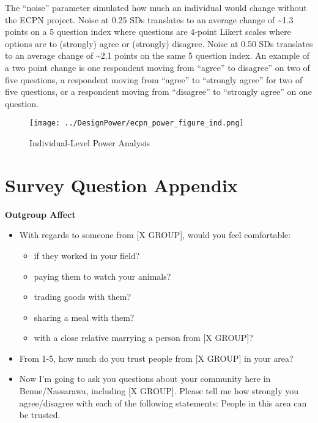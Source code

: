 \documentclass[
]{article}
\providecommand{\tightlist}{%
  \setlength{\itemsep}{0pt}\setlength{\parskip}{0pt}}
\begin{document}
The ``noise'' parameter simulated how much an individual would change
without the ECPN project. Noise at 0.25 SDs translates to an average
change of \textasciitilde1.3 points on a 5 question index where
questions are 4-point Likert scales where options are to (strongly)
agree or (strongly) disagree. Noise at 0.50 SDs translates to an average
change of \textasciitilde2.1 points on the same 5 question index. An
example of a two point change is one respondent moving from ``agree'' to
disagree'' on two of five questions, a respondent moving from ``agree''
to ``strongly agree'' for two of five questions, or a respondent moving
from ``disagree'' to ``strongly agree'' on one question.

\begin{figure}
\centering
\texttt{[image: ../DesignPower/ecpn\_power\_figure\_ind.png]}
\caption{Individual-Level Power Analysis}
\end{figure}

\hypertarget{questions}{%
\section{Survey Question Appendix}\label{questions}}

\textbf{Outgroup Affect}

\begin{itemize}
\tightlist
\item
  With regards to someone from {[}X GROUP{]}, would you feel
  comfortable:

  \begin{itemize}
  \tightlist
  \item
    if they worked in your field?
  \item
    paying them to watch your animals?
  \item
    trading goods with them?
  \item
    sharing a meal with them?
  \item
    with a close relative marrying a person from {[}X GROUP{]}?
  \end{itemize}
\item
  From 1-5, how much do you trust people from {[}X GROUP{]} in your
  area?
\item
  Now I'm going to ask you questions about your community here in
  Benue/Nassarawa, including {[}X GROUP{]}. Please tell me how strongly
  you agree/disagree with each of the following statements: People in
  this area can be trusted.
\end{itemize}
\end{document}
